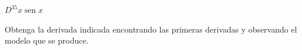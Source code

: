\item $D^{35} x \operatorname{sen} x$
\par
Obtenga la derivada indicada encontrando las primeras derivadas y observando el modelo que se produce.
